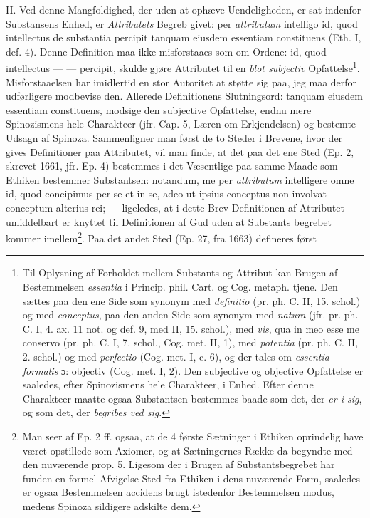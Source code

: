 \documentclass[12pt,a4paper]{book}
\newcommand{\opage}[1]{\marginnote{\footnotesize\textit{[#1]}}}
\begin{document}
II. Ved denne Mangfoldighed, der uden at ophæve Uendeligheden, er sat
indenfor Substansens Enhed, er \emph{Attributets} Begreb givet: per
\emph{attributum} intelligo id, quod intellectus de substantia
percipit tanquam eiusdem essentiam constituens (Eth. I, def. 4). Denne
Definition maa ikke misforstaaes som om Ordene: id, quod intellectus
--- --- percipit, skulde gjøre Attributet til en \emph{blot subjectiv}
Opfattelse\footnote{Til Oplysning af Forholdet mellem Substants og
Attribut kan Brugen af Bestemmelsen \emph{essentia} i Princip. phil.
Cart. og Cog. metaph. tjene. Den sættes paa den ene Side som synonym
med \emph{definitio} (pr. ph. C. II, 15. schol.) og med
\emph{conceptus}, paa den anden Side som synonym med \emph{natura}
(jfr. pr. ph. C. I, 4. ax. 11 not. og def. 9, med II, 15. schol.), med
\emph{vis}, qua in meo esse me conservo (pr. ph. C. I, 7. schol., Cog.
met. II, 1), med \emph{potentia} (pr. ph. C. II, 2. schol.) og med
\emph{perfectio} (Cog. met. I, c. 6), og der tales om \emph{essentia
formalis} ɔ: objectiv (Cog. met. I, 2). Den subjective og objective
Opfattelse er saaledes, efter Spinozismens hele Charakteer, i Enhed.
Efter denne Charakteer maatte ogsaa Substantsen bestemmes baade som
det, der \emph{er i sig}, og som det, der \emph{begribes ved sig}.}. Misforstaaelsen
har imidlertid en stor Autoritet at støtte sig paa, jeg maa derfor
udførligere modbevise den. Allerede Definitionens Slutningsord: tanquam
eiusdem essentiam constituens, modsige den subjective Opfattelse,
endnu mere Spinozismens hele Charakteer (jfr. Cap. 5, Læren om
Erkjendelsen) og bestemte Udsagn af Spinoza. Sammenligner man først de
to Steder i Brevene, hvor der gives Definitioner paa Attributet, vil
man finde, at det paa det ene Sted (Ep. 2, skrevet 1661, jfr. Ep. 4)
bestemmes i det Væsentlige paa samme Maade som Ethiken bestemmer
Substantsen: notandum, me per \emph{attributum} intelligere omne id, quod
concipimus per se et in se, adeo ut ipsius conceptus non involvat
conceptum alterius rei; --- ligeledes, at i dette Brev Definitionen af
Attributet umiddelbart er knyttet til Definitionen af Gud uden at
Substants\-%
\opage{48}\setcounter{footnote}{0}%
begrebet kommer imellem\footnote{Man seer af Ep. 2 ff. ogsaa, at de 4 første
Sætninger i Ethiken oprindelig have været opstillede som Axiomer, og at
Sætningernes Række da begyndte med den nuværende prop. 5. Ligesom der i
Brugen af Substantsbegrebet har funden en formel Afvigelse Sted fra
Ethiken i dens nuværende Form, saaledes er ogsaa Bestemmelsen accidens
brugt istedenfor Bestemmelsen modus, medens Spinoza sildigere adskilte
dem.}. Paa det andet Sted (Ep. 27, fra 1663) defineres først
\end{document}
